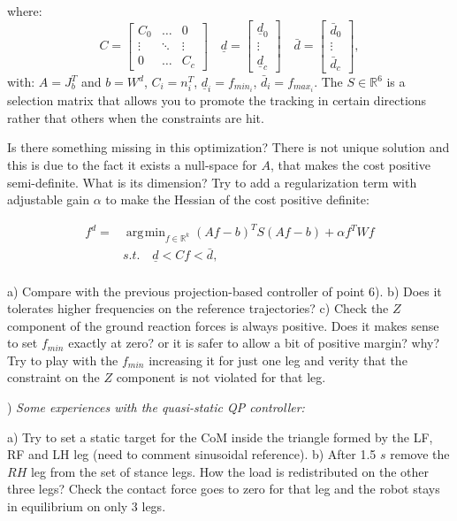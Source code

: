 \documentclass{report}
\newcommand{\Rnum}{\mathbb{R}} %
\newcommand{\mat}[1]{\ensuremath{\begin{bmatrix}#1\end{bmatrix}}}	%
\DeclareMathOperator*{\argmin}{\arg\!\min}				%
\begin{document}
%
where:
\begin{equation}
C = \mat{C_0 & \dots & 0 \\ \vdots & \ddots & \vdots \\ 0 & \dots & C_c} \quad
\underline{d} = \mat{ \underline{d}_0 \\ \vdots \\ \underline{d}_c} \quad
\bar{d} = \mat{\bar{d}_0 \\ \vdots \\ \bar{d}_c},
\end{equation}
%
with: $A = J_b^T$ and $b = W^d$, $C_i = 	n_i^T$, $\underline{d}_i = 	f_{{min}_i}$, $\bar{d}_i =f_{{max}_i}$. 
The $S \in \Rnum^6$ is a selection matrix that allows you to promote the tracking in certain directions rather that others when the constraints are hit.

Is there something missing in this optimization? There is not unique solution and this is due to the fact it exists a null-space  for $A$, that makes the cost positive semi-definite. What is its dimension?  Try to add a regularization term with adjustable gain $\alpha$ to make the 
Hessian of the cost positive definite:

\begin{equation} 
\begin{aligned} 
f^d = & \argmin_{f \in \Rnum^k} (Af-b)^T S (Af-b) + \alpha f^T W f\\
& s.t. \quad \underline{d} < C f < \bar{d},\\
\end{aligned} 
\label{eq:min_prob}
\end{equation}

a) Compare with the previous projection-based controller of point 6). 
b) Does it tolerates higher frequencies on the reference trajectories?
c) Check the $Z$ component of the ground reaction forces is always positive. Does it makes sense to set $f_{min}$ exactly at zero? or it is safer to allow a bit of positive margin? why?
 Try to play with the $f_{min}$ increasing it for just one leg and verity that the constraint on the $Z$ component is not violated for that leg.

\quad

) \textit{Some experiences with the quasi-static QP controller:}

a) Try to set a static target for the CoM inside the triangle formed by the LF, RF and LH leg (need to comment sinusoidal reference).
b) After 1.5 $s$ remove the  $RH$ leg from the set of stance legs. How the load is redistributed on the other three legs? Check the contact force goes to zero for that leg and the robot stays in equilibrium on only 3 legs.
\end{document}
